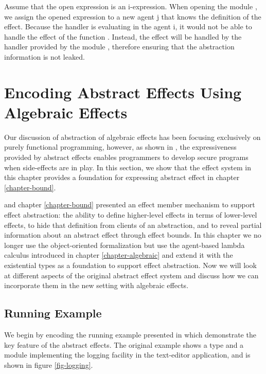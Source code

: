 Assume that the open expression is an i-expression. When opening the module , we assign the opened expression  to a new agent j that  knows the definition of the  effect. Because the  handler is evaluating in the agent i, it would not be able to handle the effect  of the function . Instead, the  effect will be handled by the handler provided by the module , therefore ensuring that the abstraction information is not leaked.



\section{Encoding Abstract Effects Using Algebraic Effects}
Our discussion of abstraction of algebraic effects has been focusing exclusively on purely functional programming, however, as shown in \citet{melicher20}, the expressiveness provided by abstract effects enables programmers to develop secure programs when side-effects are in play. In this section, we show that the effect system in this chapter provides a foundation for expressing abstract effect in chapter \ref{chapter-bound}. 

 \citet{melicher20} and chapter \ref{chapter-bound} presented an effect member mechanism to support effect abstraction: the ability to define higher-level effects in terms of lower-level effects, to hide that definition from clients of an abstraction, and to reveal partial information about an abstract effect through effect bounds. In this chapter we no longer use the object-oriented formalization but use the agent-based lambda calculus introduced in chapter \ref{chapter-algebraic} and extend it with the existential types as a foundation to support effect abstraction. Now we will look at different aspects of the original abstract effect system and discuss how we can incorporate them in the new setting with algebraic effects.
 
 
\subsection{Running Example}
We begin by encoding the running example presented in \citet{melicher20} which demonstrate the key feature of the abstract effects. The original example shows a type and a module implementing the logging facility in the text-editor application, and is shown in figure \ref{fig-logging}. 

